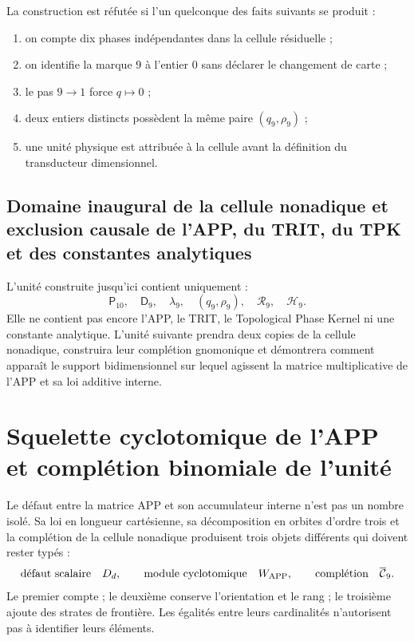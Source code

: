 \begin{criterion}
La construction est réfutée si l’un quelconque des faits suivants
se produit :
\begin{enumerate}
 \item on compte dix phases indépendantes dans la cellule résiduelle ;
 \item on identifie la marque \(9\) à l’entier \(0\) sans déclarer le
 changement de carte ;
 \item le pas \(9\to1\) force \(q\mapsto0\) ;
 \item deux entiers distincts possèdent la même paire \((q_9,\rho_9)\) ;
 \item une unité physique est attribuée à la cellule avant la définition du
 transducteur dimensionnel.
\end{enumerate}
\end{criterion}

\subsection{Domaine inaugural de la cellule nonadique et exclusion causale de l’APP, du TRIT, du TPK et des constantes analytiques}

L’unité construite jusqu’ici contient uniquement :
\[
 \mathsf P_{10},\quad
 \mathsf D_9,\quad
 \lambda_9,\quad
 (q_9,\rho_9),\quad
 \mathcal R_9,\quad
 \mathcal H_9.
\]
Elle ne contient pas encore l’APP, le TRIT, le Topological Phase Kernel ni une constante
analytique. L’unité suivante prendra deux copies de la cellule nonadique,
construira leur complétion gnomonique et démontrera comment apparaît le support
bidimensionnel sur lequel agissent la matrice multiplicative de l’APP et sa loi
additive interne.



\section{Squelette cyclotomique de l’APP et complétion binomiale de l’unité}
\label{p12-83-c1-s5:chap:app-esqueleto-completacion}

Le défaut entre la matrice APP et son accumulateur interne n’est pas un nombre
isolé. Sa loi en
longueur cartésienne, sa décomposition en orbites d’ordre trois et la
complétion de la cellule nonadique produisent trois objets différents qui doivent
rester typés :
\[
 \text{défaut scalaire}\quad D_d,
 \qquad
 \text{module cyclotomique}\quad W_{\rm APP},
 \qquad
 \text{complétion}\quad\overline{\mathcal C}_9.
\]
Le premier compte ; le deuxième conserve l’orientation et le rang ; le troisième ajoute
des strates de frontière. Les égalités entre leurs cardinalités n’autorisent pas à
identifier leurs éléments.

